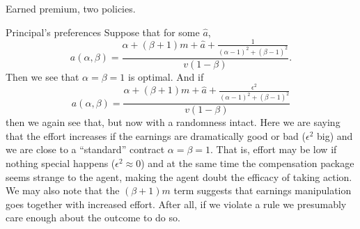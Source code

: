 \begin{example}{Earned premium, two policies.}
\begin{example}{Principal's preferences}
		Suppose that for some $\hat a$,
		\[
			a(\alpha,\beta)=\frac{\alpha+(\beta+1)m+\hat a+\frac1{(\alpha-1)^2+(\beta-1)^2}}{v(1-\beta)}.
		\]
		Then we see that $\alpha=\beta=1$ is optimal.
		And if
		\[
			a(\alpha,\beta)=\frac{\alpha+(\beta+1)m+\hat a+\frac{\epsilon^2}{(\alpha-1)^2+(\beta-1)^2}}{v(1-\beta)}
		\]
		then we again see that, but now with a randomness intact. Here we are saying that the effort increases if the earnings are dramatically good or bad ($\epsilon^2$ big)
		and we are close to a ``standard'' contract $\alpha=\beta=1$. That is, effort may be low if nothing special happens ($\epsilon^2\approx 0$) and at the same time the compensation package seems strange to the agent, making the agent doubt the efficacy of taking action.
		We may also note that the $(\beta+1)m$ term suggests that earnings manipulation goes together with increased effort. After all, if we violate a rule we presumably care enough about the outcome to do so.
	\end{example}
\end{example}